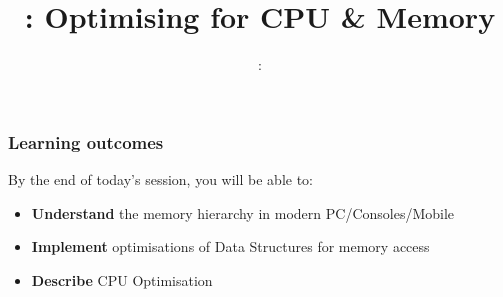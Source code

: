 \usepackage{../../beamerthemeFalmouthGamesAcademy}
\usepackage{multimedia}
\graphicspath{ {../../} }


\usepackage[normalem]{ulem}
\usepackage{wasysym}

\usepackage{pdfpages}

\usetikzlibrary{arrows,automata}




\title{\sessionnumber: Optimising for CPU \& Memory}
\subtitle{\modulecode: \moduletitle}

\frame{\titlepage} 

\begin{frame}
	\frametitle{Learning outcomes}
	By the end of today's session, you will be able to:
	\begin{itemize}
		\item \textbf{Understand} the memory hierarchy in modern PC/Consoles/Mobile
		\item \textbf{Implement} optimisations of Data Structures for memory access
		\item \textbf{Describe} CPU Optimisation
	\end{itemize}
\end{frame}






